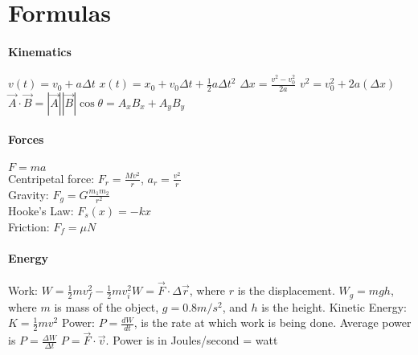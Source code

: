 \documentclass[10pt,letter]{article}
\begin{document}
\pagebreak
\section*{Formulas} 
\paragraph{Kinematics}
$v(t)=v_0 + a\Delta t$ \quad $x(t) = x_0 + v_0\Delta t + \frac{1}{2}a\Delta t^2$ \quad $\Delta x = \frac{v^2-v_0^2}{2a}$ \quad $v^2 = v_0^2+2a(\Delta x)$\quad $\vec{A}\cdot\vec{B}=|\vec{A}||\vec{B}|\cos\theta = A_xB_x+A_yB_y$

\paragraph{Forces}
$F=ma$ \\ 
Centripetal force: $F_r=\frac{Mv^2}{r}$, $a_r=\frac{v^2}{r}$\\ 
Gravity: $F_g=G\frac{m_1m_2}{r^2}$ \\ 
Hooke's Law: $F_s(x)=-kx$ \\ 
Friction: $F_f=\mu N$

\paragraph{Energy}
Work: $W = \frac{1}{2}mv^2_f-\frac{1}{2}mv^2_i$\quad $W = \vec{F}\cdot \Delta\vec{r}$, where $r$ is the displacement. $W_g=mgh$, where $m$ is mass of the object, $g = 0.8m/s^2$, and $h$ is the height. 
Kinetic Energy: $K=\frac{1}{2}mv^2$
Power: $P=\frac{dW}{dt}$, is the rate at which work is being done. Average power is $P=\frac{\Delta W}{\Delta t}$ $P = \vec{F}\cdot\vec{v}$. Power is in Joules/second = watt
\end{document}

